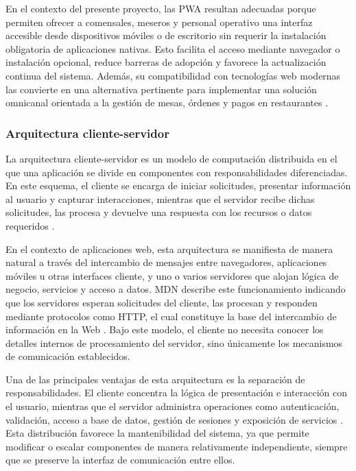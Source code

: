 \documentclass[12pt]{report}
\begin{document}
En el contexto del presente proyecto, las PWA resultan adecuadas porque permiten ofrecer a comensales, meseros y personal operativo una interfaz accesible desde dispositivos móviles o de escritorio sin requerir la instalación obligatoria de aplicaciones nativas. Esto facilita el acceso mediante navegador o instalación opcional, reduce barreras de adopción y favorece la actualización continua del sistema. Además, su compatibilidad con tecnologías web modernas las convierte en una alternativa pertinente para implementar una solución omnicanal orientada a la gestión de mesas, órdenes y pagos en restaurantes \cite{mdn_pwa_2025,webdev_pwa_overview,mdn_pwa_best_practices_2025}.

\subsubsection{Arquitectura cliente-servidor}

La arquitectura cliente-servidor es un modelo de computación distribuida en el que una aplicación se divide en componentes con responsabilidades diferenciadas. En este esquema, el cliente se encarga de iniciar solicitudes, presentar información al usuario y capturar interacciones, mientras que el servidor recibe dichas solicitudes, las procesa y devuelve una respuesta con los recursos o datos requeridos \cite{mdn_client_server_2025,mdn_http_overview_2026,ibm_client_server_model}.

En el contexto de aplicaciones web, esta arquitectura se manifiesta de manera natural a través del intercambio de mensajes entre navegadores, aplicaciones móviles u otras interfaces cliente, y uno o varios servidores que alojan lógica de negocio, servicios y acceso a datos. MDN describe este funcionamiento indicando que los servidores esperan solicitudes del cliente, las procesan y responden mediante protocolos como HTTP, el cual constituye la base del intercambio de información en la Web \cite{mdn_client_server_2025,mdn_http_overview_2026}. Bajo este modelo, el cliente no necesita conocer los detalles internos de procesamiento del servidor, sino únicamente los mecanismos de comunicación establecidos.

Una de las principales ventajas de esta arquitectura es la separación de responsabilidades. El cliente concentra la lógica de presentación e interacción con el usuario, mientras que el servidor administra operaciones como autenticación, validación, acceso a base de datos, gestión de sesiones y exposición de servicios \cite{mdn_server_side_intro_2025,oracle_client_server_2021}. Esta distribución favorece la mantenibilidad del sistema, ya que permite modificar o escalar componentes de manera relativamente independiente, siempre que se preserve la interfaz de comunicación entre ellos.
\end{document}
